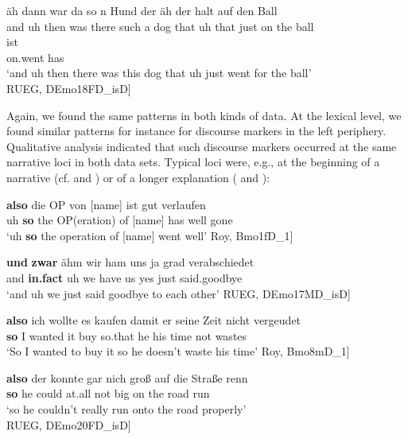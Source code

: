 \documentclass[output=paper,colorlinks,citecolor=brown]{langscibook}
\begin{document}
\ea\label{ex:ch1:ex31}
 {äh} {dann} {war} {da} {so} {n} {Hund} {der} {äh} {der} {halt} {auf} {den} {Ball}  \\
and uh then was there such a dog that uh that just on the ball  \\
\sn {} {ist} \\
on.went has \\
\trans ‘and uh then there was this dog that uh just went for the ball’ \\ \hspace{\fill}{[}RUEG, DEmo18FD\_isD{]}
\z

Again, we found the same patterns in both kinds of data.
At the lexical level, we found similar patterns for instance for discourse markers in the left periphery. Qualitative analysis indicated that such discourse markers occurred at the same narrative loci in both data sets. Typical loci were, e.g., at the beginning of a narrative (cf.  and ) or of a longer explanation ( and ):

\ea\label{ex:ch1:ex32}
 \textbf{{also}} {die} {OP} {von} {[name]} {ist} {gut} {verlaufen} \\
uh \textbf{so} the OP(eration) of [name] has well gone \\
\trans ‘uh \textbf{so} the operation of [name] went well’ \hspace{\fill}{[}Roy, Bmo1fD\_1{]}
\z

\ea\label{ex:ch1:ex33}
\gll \textbf{{und}} \textbf{{zwar}} {ähm} {wir} {ham} {uns} {ja} {grad} {verabschiedet} \\
and \textbf{in.fact} uh we have us yes just said.goodbye \\
\trans ‘and uh we just said goodbye to each other’ \hspace{\fill}{[}RUEG, DEmo17MD\_isD{]}
\z

\ea\label{ex:ch1:ex34}
\gll \textbf{{also}} {ich} {wollte} {es} {kaufen} {damit} {er} {seine} {Zeit} {nicht} {vergeudet} \\
\textbf{so} I wanted it buy so.that he his time not wastes \\
\trans ‘So I wanted to buy it so he doesn’t waste his time’ \hspace{\fill}{[}Roy, Bmo8mD\_1{]}
\z

\ea\label{ex:ch1:ex35}
\gll \textbf{{also}} {der} {konnte} {gar} {nich} {groß} {auf} {die} {Straße} {renn} \\
\textbf{so} he could at.all not big on the road run \\
\trans ‘so he couldn't really run onto the road properly’ \\ \hspace{\fill}{[}RUEG, DEmo20FD\_isD{]}
\z
\end{document}
